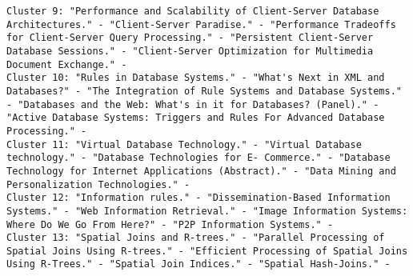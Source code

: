 \documentclass[11pt]{article}
\begin{document}
\begin{verbatim}
Cluster 9: "Performance and Scalability of Client-Server Database Architectures." - "Client-Server Paradise." - "Performance Tradeoffs for Client-Server Query Processing." - "Persistent Client-Server Database Sessions." - "Client-Server Optimization for Multimedia Document Exchange." - 
Cluster 10: "Rules in Database Systems." - "What's Next in XML and Databases?" - "The Integration of Rule Systems and Database Systems." - "Databases and the Web: What's in it for Databases? (Panel)." - "Active Database Systems: Triggers and Rules For Advanced Database Processing." - 
Cluster 11: "Virtual Database Technology." - "Virtual Database technology." - "Database Technologies for E- Commerce." - "Database Technology for Internet Applications (Abstract)." - "Data Mining and Personalization Technologies." - 
Cluster 12: "Information rules." - "Dissemination-Based Information Systems." - "Web Information Retrieval." - "Image Information Systems: Where Do We Go From Here?" - "P2P Information Systems." - 
Cluster 13: "Spatial Joins and R-trees." - "Parallel Processing of Spatial Joins Using R-trees." - "Efficient Processing of Spatial Joins Using R-Trees." - "Spatial Join Indices." - "Spatial Hash-Joins." - 



\end{verbatim}
\end{document}
